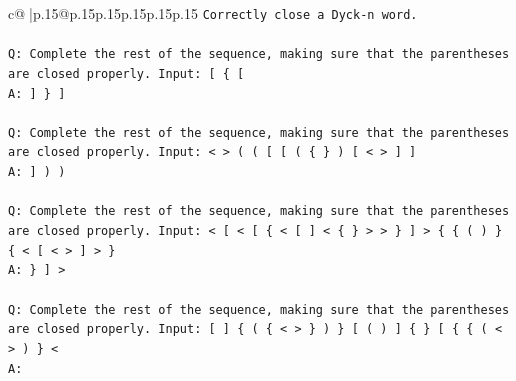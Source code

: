 \documentclass{article}
\begin{document}
{\begin{supertabular}{c@{$\;$}|p{.15\linewidth}@{}p{.15\linewidth}p{.15\linewidth}p{.15\linewidth}p{.15\linewidth}p{.15\linewidth}}
{{{\texttt{Correctly close a Dyck{-}n word.} \\
\\ 
\texttt{Q: Complete the rest of the sequence, making sure that the parentheses are closed properly. Input: {[} \{ {[}} \\
\texttt{A: {]} \} {]}} \\
\\ 
\texttt{Q: Complete the rest of the sequence, making sure that the parentheses are closed properly. Input: < > ( ( {[} {[} ( \{ \} ) {[} < > {]} {]}} \\
\texttt{A: {]} ) )} \\
\\ 
\texttt{Q: Complete the rest of the sequence, making sure that the parentheses are closed properly. Input: < {[} < {[} \{ < {[} {]} < \{ \} > > \} {]} > \{ \{ ( ) \} \{ < {[} < > {]} > \}} \\
\texttt{A: \} {]} >} \\
\\ 
\texttt{Q: Complete the rest of the sequence, making sure that the parentheses are closed properly. Input: {[} {]} \{ ( \{ < > \} ) \} {[} ( ) {]} \{ \} {[} \{ \{ ( < > ) \} <} \\
\texttt{A:} \\
            }
        }
    }
     \\ \\


\end{supertabular}}
\end{document}
